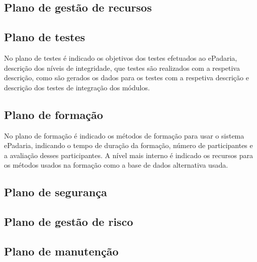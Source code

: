 \subsection{Plano de gestão de recursos}


\subsection{Plano de testes}
No plano de testes é indicado os objetivos dos testes efetuados ao ePadaria, descrição dos níveis de integridade, que testes são realizados com a respetiva descrição, como são gerados os dados para os testes com a respetiva descrição e descrição dos testes de integração dos módulos.
\subsection{Plano de formação}
No plano de formação é indicado os métodos de formação para usar o sistema ePadaria, indicando o tempo de duração da formação, número de participantes e a avaliação desses participantes. A nível mais interno é indicado os recursos para os métodos usados na formação como a base de dados alternativa usada.
\subsection{Plano de segurança}
\subsection{Plano de gestão de risco}
\subsection{Plano de manutenção}